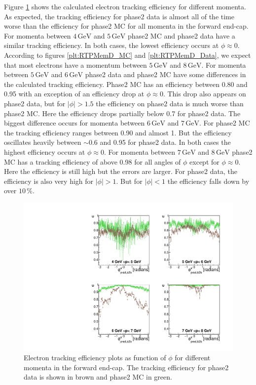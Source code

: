 \documentclass[a4paper,11pt,twosided,final,german,openbib,pdftex,listof=totoc,bibliography=totoc]{scrbook}
\begin{document}
Figure \ref{plt:xPMPhiemFC} shows the calculated electron tracking efficiency for different momenta. As expected, the tracking efficiency for phase2 data is almost all of the time worse than the efficiency for phase2 MC for all momenta in the forward end-cap. For momenta between $4\,\textrm{GeV}$ and $5\,\textrm{GeV}$ phase2 MC and phase2 data have a similar tracking efficiency. In both cases, the lowest efficiency occurs at $\phi \approx 0$. According to figures \ref{plt:RTPMemD_MC} and \ref{plt:RTPMemD_Data}, we expect that most electrons have a momentum between $5\,\textrm{GeV}$ and $8\,\textrm{GeV}$. For momenta between $5\,\textrm{GeV}$ and $6\,\textrm{GeV}$ phase2 data and phase2 MC have some differences in the calculated tracking efficiency. Phase2 MC has an efficiency between 0.80 and 0.95 with an exception of an efficiency drop at $\phi \approx 0$. This drop also appears on phase2 data, but for $|\phi| > 1.5$ the efficiency on phase2 data is much worse than phase2 MC. Here the efficiency drops partially below 0.7 for phase2 data.
The biggest difference occurs for momenta between $6\,\textrm{GeV}$ and $7\,\textrm{GeV}$. For phase2 MC the tracking efficiency ranges between 0.90 and almost 1. But the efficiency oscillates heavily between $\sim 0.6$ and 0.95 for phase2 data. In both cases the highest efficiency occurs at $\phi \approx 0$. 
For momenta between $7\,\textrm{GeV}$ and $8\,\textrm{GeV}$ phase2 MC has a tracking efficiency of above 0.98 for all angles of $\phi$ except for $\phi \approx 0$. Here the efficiency is still high but the errors are larger. For phase2 data, the efficiency is also very high for $|\phi| > 1$. But for $|\phi| < 1$ the efficiency falls down by over $10\,\%$.

\begin{figure}[!htbp]
	\centering
	\includegraphics[width=\textwidth]{Plots/master/xPMPhiemFC}
	\caption[Momentum $\phi$ Electron Forward End-Cap Efficiency Phase2]{Electron tracking efficiency plots as function of $\phi$ for different momenta in the forward end-cap. The tracking efficiency for phase2 data is shown in brown and phase2 MC in green.}
		\label{plt:xPMPhiemFC}
\end{figure}
\end{document}

